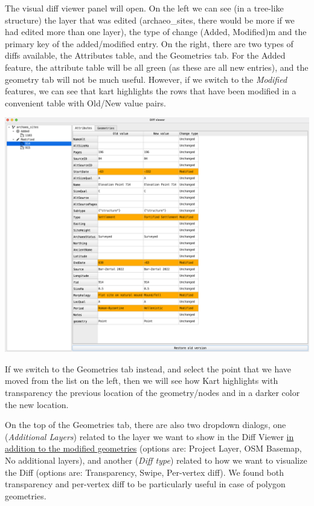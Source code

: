 \documentclass[
  letterpaper,
  DIV=11,
  numbers=noendperiod]{scrartcl}
\begin{document}
The visual diff viewer panel will open. On the left we can see (in a
tree-like structure) the layer that was edited (archaeo\_sites, there
would be more if we had edited more than one layer), the type of change
(Added, Modified)m and the primary key of the added/modified entry. On
the right, there are two types of diffs available, the Attributes table,
and the Geometries tab. For the Added feature, the attribute table will
be all green (as these are all new entries), and the geometry tab will
not be much useful. However, if we switch to the \emph{Modified}
features, we can see that kart highlights the rows that have been
modified in a convenient table with Old/New value pairs.

\begin{center}
\includegraphics{img/kart-diff-attributes.png}
\end{center}

If we switch to the Geometries tab instead, and select the point that we
have moved from the list on the left, then we will see how Kart
highlights with transparency the previous location of the geometry/nodes
and in a darker color the new location.

On the top of the Geometries tab, there are also two dropdown dialogs,
one (\emph{Additional Layers}) related to the layer we want to show in
the Diff Viewer \ul{in addition to the modified geometries} (options
are: Project Layer, OSM Basemap, No additional layers), and another
(\emph{Diff type}) related to how we want to visualize the Diff (options
are: Transparency, Swipe, Per-vertex diff). We found both transparency
and per-vertex diff to be particularly useful in case of polygon
geometries.
\end{document}
